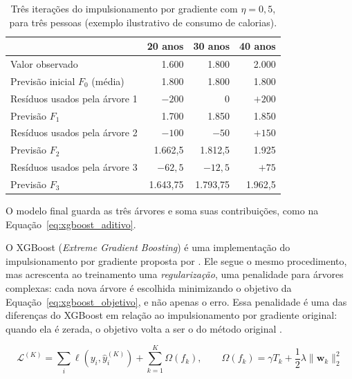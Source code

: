 \begin{table}[htbp]
    \centering
    \caption{Três iterações do impulsionamento por gradiente com \(\eta=0{,}5\), para três pessoas (exemplo ilustrativo de consumo de calorias).}
    \label{tab:boosting_exemplo}
    \small
    \begin{tabular}{lrrr}
        \toprule
        & \textbf{20 anos} & \textbf{30 anos} & \textbf{40 anos} \\
        \midrule
        Valor observado & 1.600 & 1.800 & 2.000 \\
        Previsão inicial \(F_0\) (média) & 1.800 & 1.800 & 1.800 \\
        Resíduos usados pela árvore 1 & \(-200\) & 0 & \(+200\) \\
        Previsão \(F_1\) & 1.700 & 1.850 & 1.850 \\
        Resíduos usados pela árvore 2 & \(-100\) & \(-50\) & \(+150\) \\
        Previsão \(F_2\) & 1.662,5 & 1.812,5 & 1.925 \\
        Resíduos usados pela árvore 3 & \(-62{,}5\) & \(-12{,}5\) & \(+75\) \\
        Previsão \(F_3\) & 1.643,75 & 1.793,75 & 1.962,5 \\
        \bottomrule
    \end{tabular}
\end{table}

O modelo final guarda as três árvores e soma suas contribuições, como na Equação~\ref{eq:xgboost_aditivo}.

O XGBoost (\textit{Extreme Gradient Boosting}) é uma implementação do impulsionamento por gradiente proposta por . Ele segue o mesmo procedimento, mas acrescenta ao treinamento uma \emph{regularização}, uma penalidade para árvores complexas: cada nova árvore é escolhida minimizando o objetivo da Equação~\ref{eq:xgboost_objetivo}, e não apenas o erro. Essa penalidade é uma das diferenças do XGBoost em relação ao impulsionamento por gradiente original: quando ela é zerada, o objetivo volta a ser o do método original \cite{chen2016xgboost}.

\begin{equation}
    \mathcal{L}^{(K)}
    =
    \sum_i \ell(y_i, \hat{y}_i^{(K)})
    +
    \sum_{k=1}^{K}\Omega(f_k),
    \qquad
    \Omega(f_k)=\gamma T_k + \frac{1}{2}\lambda\lVert\mathbf{w}_k\rVert_2^2
    \label{eq:xgboost_objetivo}
\end{equation}

